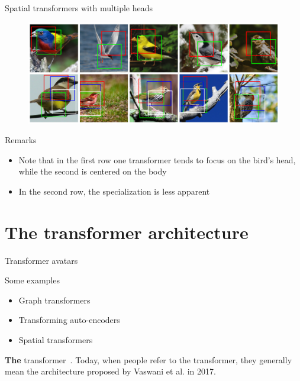 \documentclass[xcolor=pdftex,dvipsnames,table,mathserif]{beamer}
\begin{document}
\begin{frame}{Spatial transformers with multiple heads}

  \begin{figure}[ht]
    \centering
    \includegraphics[width=\textwidth]{spatial_transformers_birds}
  \end{figure}

\begin{block}{Remarks}
  \begin{itemize}
  \item Note that in the first row one transformer tends to focus on the bird's head, while the second is centered on the body
  \item In the second row, the specialization is less apparent
  \end{itemize}
\end{block}

\end{frame}

\section{The transformer architecture}


\begin{frame}{Transformer avatars}

  \begin{block}{Some examples}
    \begin{itemize}
    \item Graph transformers~\cite{lecun_gradient-based_1998}
    \item Transforming auto-encoders~\cite{hinton_transforming_2011}
    \item Spatial transformers~\cite{jaderberg_spatial_2016}
    \end{itemize}
  \end{block}

  \begin{alertblock}{\textbf{The} transformer~\cite{vaswani_attention_2017}.}
    Today, when people refer to the transformer, they generally mean the architecture proposed by Vaswani et al. in 2017.
  \end{alertblock}

\end{frame}
\end{document}
